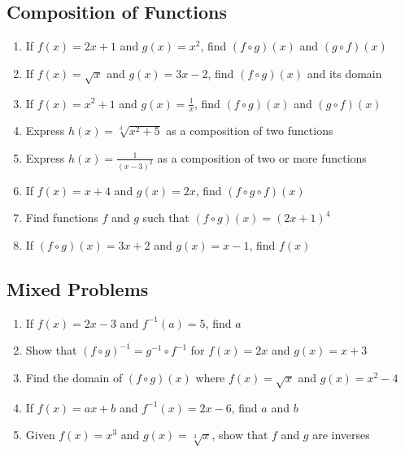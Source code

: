 \documentclass[12pt,a4paper]{article}
\begin{document}
\subsection{Composition of Functions}

\begin{enumerate}[resume]
    \item If $f(x) = 2x + 1$ and $g(x) = x^2$, find $(f \circ g)(x)$ and $(g \circ f)(x)$
    
    \item If $f(x) = \sqrt{x}$ and $g(x) = 3x - 2$, find $(f \circ g)(x)$ and its domain
    
    \item If $f(x) = x^2 + 1$ and $g(x) = \frac{1}{x}$, find $(f \circ g)(x)$ and $(g \circ f)(x)$
    
    \item Express $h(x) = \sqrt[3]{x^2 + 5}$ as a composition of two functions
    
    \item Express $h(x) = \frac{1}{(x-3)^2}$ as a composition of two or more functions
    
    \item If $f(x) = x + 4$ and $g(x) = 2x$, find $(f \circ g \circ f)(x)$
    
    \item Find functions $f$ and $g$ such that $(f \circ g)(x) = (2x + 1)^4$
    
    \item If $(f \circ g)(x) = 3x + 2$ and $g(x) = x - 1$, find $f(x)$
\end{enumerate}

\subsection{Mixed Problems}

\begin{enumerate}[resume]
    \item If $f(x) = 2x - 3$ and $f^{-1}(a) = 5$, find $a$
    
    \item Show that $(f \circ g)^{-1} = g^{-1} \circ f^{-1}$ for $f(x) = 2x$ and $g(x) = x + 3$
    
    \item Find the domain of $(f \circ g)(x)$ where $f(x) = \sqrt{x}$ and $g(x) = x^2 - 4$
    
    \item If $f(x) = ax + b$ and $f^{-1}(x) = 2x - 6$, find $a$ and $b$
    
    \item Given $f(x) = x^3$ and $g(x) = \sqrt[3]{x}$, show that $f$ and $g$ are inverses
\end{enumerate}
\end{document}
